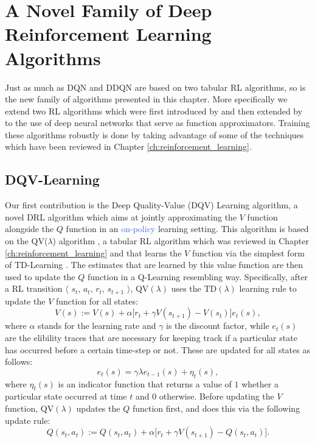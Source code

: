 \section{A Novel Family of Deep Reinforcement Learning Algorithms}
\label{sec:dqv_family}

Just as much as DQN and DDQN are based on two tabular RL algorithms, so is the new family of algorithms presented in this chapter. More specifically we extend two RL algorithms which were first introduced by \citet{wiering2005qv} and then extended by \citet{wiering2009qv} to the use of deep neural networks that serve as function approximators. Training these algorithms robustly is done by taking advantage of some of the techniques which have been reviewed in Chapter \ref{ch:reinforcement_learning}.

\subsection{DQV-Learning}
Our first contribution is the Deep Quality-Value (DQV) Learning algorithm, a novel DRL algorithm which aims at jointly approximating the $V$ function alongside the $Q$ function in an \textcolor{RoyalBlue}{on-policy} learning setting. This algorithm is based on the QV($\lambda$) algorithm \cite{wiering2005qv}, a tabular RL algorithm which was reviewed in Chapter \ref{ch:reinforcement_learning} and that learns the $V$ function via the simplest form of TD-Learning \cite{sutton1988learning}. The estimates that are learned by this value function are then used to update the $Q$ function in a Q-Learning resembling way. Specifically, after a RL transition $\langle$ $s_{t}$, $a_{t}$, $r_{t}$, $s_{t+1}$ $\rangle$, QV$(\lambda)$ uses the TD$(\lambda)$ learning rule \cite{sutton1988learning} to update the $V$ function for all states: 
\begin{equation}
V(s):= V(s) + \alpha \big[ r_{t} + \gamma V(s_{t+1}) - V(s_t) \big] e_{t}(s),
\label{eq:qv_lambda_v_update}
\end{equation}
where $\alpha$ stands for the learning rate and $\gamma$ is the discount factor, while $e_t(s)$ are the elibility traces \cite{peng1994incremental, wiering1998speeding, geist2014off} that are necessary for keeping track if a particular state has occurred before a certain time-step or not. These are updated for all states as follows:  
\begin{equation} 
e_{t}(s) = \gamma \lambda e_{t-1}(s) + \eta_t(s),
\end{equation}
where $\eta_t(s)$ is an indicator function that returns a value of $1$ whether a particular state occurred at time $t$ and $0$ otherwise. Before updating the $V$ function, QV$(\lambda)$ updates the $Q$ function first, and does this via the following update rule:
\begin{equation}
Q(s_{t}, a_{t}):= Q(s_{t}, a_{t}) + \alpha \big[r_{t} + \gamma V(s_{t+1}) - Q(s_{t}, a_{t}) \big].
\label{eq:qv_lambda_q_update}
\end{equation}

